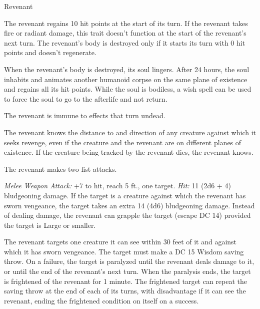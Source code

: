\documentclass[10pt,a4paper,twoside,bg=none,twocolumn,openany,nodeprecatedcode]{dndbook}
\begin{document}
\begin{DndMonster}[float=t]{Revenant}
\DndMonsterBasics[
armor-class = {13 (leather armor)},
hit-points = {\DndDice{16d8 + 64}},
speed = {30 ft.}
]
\DndMonsterAbilityScores[
 str = 18,
 dex = 14,
 con = 18,
 int = 13,
 wis = 16,
 cha = 18
]
\DndMonsterDetails[
saving-throws = {Str +7, Con +7, Wis +6, Cha +7},
damage-resistances = {necrotic, psychic},
damage-immunities = {poison},
senses = {darkvision 60 ft., passive perception 13},
languages = {the languages it knew in life},
challenge = 5,
]
The revenant regains 10 hit points at the start of its turn. If the revenant takes fire or radiant damage, this trait doesn't function at the start of the revenant's next turn. The revenant's body is destroyed only if it starts its turn with 0 hit points and doesn't regenerate.

When the revenant's body is destroyed, its soul lingers. After 24 hours, the soul inhabits and animates another humanoid corpse on the same plane of existence and regains all its hit points. While the soul is bodiless, a wish spell can be used to force the soul to go to the afterlife and not return.

The revenant is immune to effects that turn undead.

The revenant knows the distance to and direction of any creature against which it seeks revenge, even if the creature and the revenant are on different planes of existence. If the creature being tracked by the revenant dies, the revenant knows.

\par
{}
The revenant makes two fist attacks.

\textsl{Melee Weapon Attack:} +7 to hit, reach 5 ft., one target. \textsl{Hit:} 11 (2d6 + 4) bludgeoning damage. If the target is a creature against which the revenant has sworn vengeance, the target takes an extra 14 (4d6) bludgeoning damage. Instead of dealing damage, the revenant can grapple the target (escape DC 14) provided the target is Large or smaller.

The revenant targets one creature it can see within 30 feet of it and against which it has sworn vengeance. The target must make a DC 15 Wisdom saving throw. On a failure, the target is paralyzed until the revenant deals damage to it, or until the end of the revenant's next turn. When the paralysis ends, the target is frightened of the revenant for 1 minute. The frightened target can repeat the saving throw at the end of each of its turns, with disadvantage if it can see the revenant, ending the frightened condition on itself on a success.

\end{DndMonster}
\end{document}
